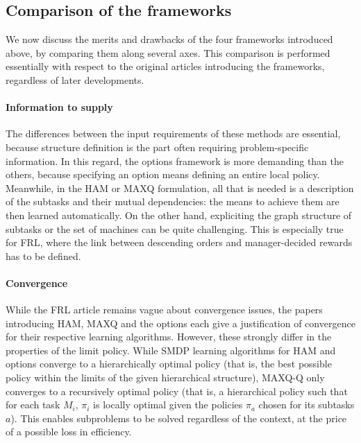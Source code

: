 \documentclass{article}
\begin{document}
\subsection{Comparison of the frameworks}

We now discuss the merits and drawbacks of the four frameworks introduced above, by comparing them along several axes. This comparison is performed essentially with respect to the original articles introducing the frameworks, regardless of later developments.

\paragraph{Information to supply} The differences between the input requirements of these methods are essential, because structure definition is the part often requiring problem-specific information. In this regard, the options framework is more demanding than the others, because specifying an option means defining an entire local policy. Meanwhile, in the HAM or MAXQ formulation, all that is needed is a description of the subtasks and their mutual dependencies: the means to achieve them are then learned automatically. On the other hand, expliciting the graph structure of subtasks or the set of machines can be quite challenging. This is especially true for FRL, where the link between descending orders and manager-decided rewards has to be defined.

\paragraph{Convergence} While the FRL article remains vague about convergence issues, the papers introducing HAM, MAXQ and the options each give a justification of convergence for their respective learning algorithms. However, these strongly differ in the properties of the limit policy. While SMDP learning algorithms for HAM and options converge to a hierarchically optimal policy (that is, the best possible policy within the limits of the given hierarchical structure), MAXQ-Q only converges to a recursively optimal policy (that is, a hierarchical policy such that for each task $M_i$, $\pi_i$ is locally optimal given the policies $\pi_a$ chosen for its subtasks $a$). This enables subproblems to be solved regardless of the context, at the price of a possible loss in efficiency.
\end{document}
